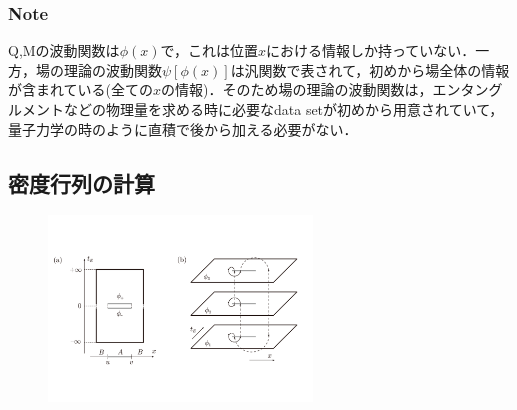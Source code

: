 \hrulefill

\subsubsection{Note}
Q,Mの波動関数は$\phi(x)$で，これは位置$x$における情報しか持っていない．一方，場の理論の波動関数$\psi[\phi(x)]$は汎関数で表されて，初めから場全体の情報が含まれている(全ての$x$の情報)．そのため場の理論の波動関数は，エンタングルメントなどの物理量を求める時に必要なdata setが初めから用意されていて，量子力学の時のように直積で後から加える必要がない．

\subsection{密度行列の計算}
\begin{figure}[H]
\begin{center}
  \includegraphics[width=7cm,angle=270]{replica.pdf}
  　　　\caption{}
  　　\label{desitter}
\end{center}
\end{figure}
